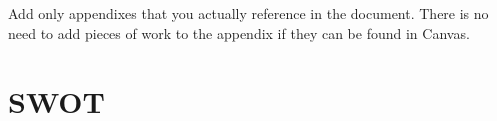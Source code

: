 Add only appendixes that you actually reference in the document.
There is no need to add pieces of work to the appendix if they can be found in Canvas.

\chapter{SWOT}
\label{ch:swot}


%

